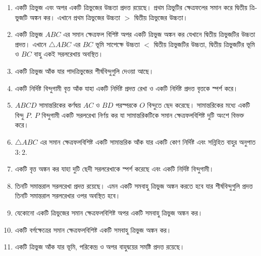 \documentclass[11pt, a4paper]{article}
\begin{document}
\begin{enumerate}
	\item \textbengali{একটি ত্রিভুজ এবং অপর একটি ত্রিভুজের উচ্চতা প্রদত্ত রয়েছে। প্রথম ত্রিভুটির ক্ষেত্রফলের সমান করে দ্বিতীয় ত্রিভুজটি অঙ্কন কর। এখানে প্রথম ত্রিভুজের উচ্চতা} $>$ \textbengali{দ্বিতীয় ত্রিভুজের উচ্চতা।}
	
	\item \textbengali{একটি ত্রিভুজ} $ABC$ \textbengali{এর সমান ক্ষেত্রফল বিশিষ্ট অপর একটি ত্রিভুজ অঙ্কন কর যেখানে দ্বিতীয় ত্রিভুজটির উচ্চতা প্রদত্ত। এখানে} $\bigtriangleup ABC$ \textbengali{এর} $BC$ \textbengali{ভূমি সাপেক্ষে উচ্চতা} $<$ \textbengali{দ্বিতীয় ত্রিভুজটির উচ্চতা, দ্বিতীয় ত্রিভুজটির ভূমি ও} $BC$ \textbengali{বাহু একই সরলরেখায় অবস্থিত।}
	
	\item \textbengali{একটি ত্রিভুজ আঁক  যার পাদত্রিভুজের শীর্ষবিন্দুগুলি দেওয়া আছে।}
	
	\item \textbengali{একটি নির্দিষ্ট বিন্দুগামী বৃত্ত আঁক যাহা একটি নির্দিষ্ট প্রদত্ত রেখা ও একটি নির্দিষ্ট প্রদত্ত বৃত্তকে স্পর্শ করে।}
	
	\item $ABCD$ \textbengali{সামান্তরিকের কর্ণদ্বয়} $AC$ \textbengali{ও} $BD$ \textbengali{পরস্পরকে} $O$ \textbengali{বিন্দুতে ছেদ করেছে। সামান্তরিকের মধ্যে একটি বিন্দু} $P$. $P$ \textbengali{বিন্দুগামী একটি সরলরেখা নির্ণয় কর যা সামান্তরিকটিকে সমান ক্ষেত্রফলবিশিষ্ট দুটি অংশে বিভক্ত করে।}
	
	\item $\bigtriangleup ABC$ \textbengali{এর সমান ক্ষেত্রফলবিশিষ্ট একটি সামান্তরিক আঁক যার একটি কোণ নির্দিষ্ট এবং সন্নিহিত বাহুর অনুপাত} $3:2$.
	
	\item \textbengali{একটি বৃত্ত অঙ্কন কর যাহা দুটি ছেদী সরলরেখাকে স্পর্শ করেছে এবং একটি নির্দিষ্ট বিন্দুগামী।}
	
	\item \textbengali{তিনটি সমান্তরাল সরলরেখা প্রদত্ত রয়েছে। এমন একটি সমবাহু ত্রিভুজ অঙ্কন করতে হবে যার শীর্ষবিন্দুগুলি প্রদত্ত তিনটি সমান্তরাল সরলরেখার ওপর অবস্থিত হবে।}
	
	\item \textbengali{যেকোনো একটি ত্রিভুজের সমান ক্ষেত্রফলবিশিষ্ট অপর একটি সমবাহু ত্রিভুজ অঙ্কন কর।}
	
	\item \textbengali{একটি বর্গক্ষেত্রের সমান ক্ষেত্রফলবিশিষ্ট একটি সমবাহু ত্রিভুজ অঙ্কন কর।}
	
	\item \textbengali{একটি ত্রিভুজ আঁক যার ভূমি, পরিকেন্দ্র ও অপর বাহুদ্বয়ের সমষ্টি প্রদত্ত রয়েছে।}
	

\end{enumerate}
\end{document}
